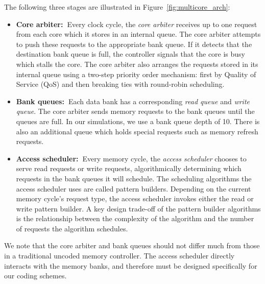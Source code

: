 The following three stages are illustrated in Figure~\ref{fig:multicore_arch}:
\begin{itemize}
\item \textbf{Core arbiter:~}Every clock cycle, the \textit{core arbiter} receives up to one request from each core which it stores in an internal queue. The core arbiter attempts to push these requests to the appropriate bank queue. If it detects that the destination bank queue is full, the controller signals that the core is busy which stalls the core. The core arbiter also arranges the requests stored in its internal queue using a two-step priority order mechanism: first by Quality of Service (QoS) and then breaking ties with round-robin scheduling.

\item \textbf{Bank queues:~}Each data bank has a corresponding \textit{read queue} and \textit{write queue}.  The core arbiter sends memory requests to the bank queues until the queues are full. In our simulations, we use a bank queue depth of 10. There is also an additional queue which holds special requests such as memory refresh requests.

\item \textbf{Access scheduler:~}Every memory cycle, the \textit{access scheduler} chooses to serve read requests or write requests, algorithmically determining which requests in the bank queues it will schedule. The scheduling algorithms the access scheduler uses are called pattern builders. Depending on the current memory cycle's request type, the access scheduler invokes either the read or write pattern builder. A key design trade-off of the pattern builder algorithms is the relationship between the complexity of the algorithm and the number of requests the algorithm schedules.
\end{itemize}

We note that the core arbiter and bank queues should not differ much from those in a traditional uncoded memory controller. The access scheduler directly interacts with the memory banks, and therefore must be designed specifically for our coding schemes.


